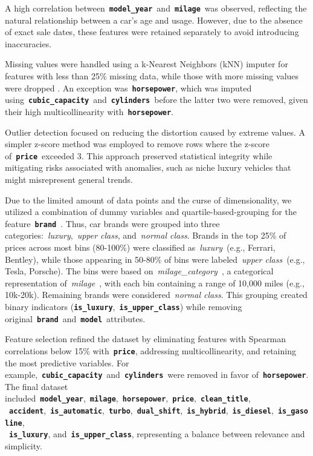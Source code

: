 \documentclass[a4paper,oneside,bibliography=totoc]{scrbook}
\begin{document}
A high correlation between~\textbf{\texttt{model\_year}}~and~\textbf{\texttt{milage}}~was observed, reflecting the natural relationship between a car's age and usage. However, due to the absence of exact sale dates, these features were retained separately to avoid introducing inaccuracies.

Missing values were handled using a k-Nearest Neighbors (kNN) imputer for features with less than 25\% missing data, while those with more missing values were dropped \cite{jadhav2019}. An exception was~\textbf{\texttt{horsepower}}, which was imputed using~\textbf{\texttt{cubic\_capacity}}~and~\textbf{\texttt{cylinders}}~before the latter two were removed, given their high multicollinearity with~\textbf{\texttt{horsepower}}.

Outlier detection focused on reducing the distortion caused by extreme values. A simpler z-score method was employed to remove rows where the z-score of~\textbf{\texttt{price}}~exceeded 3. This approach preserved statistical integrity while mitigating risks associated with anomalies, such as niche luxury vehicles that might misrepresent general trends.

Due to the limited amount of data points and the curse of dimensionality, we utilized a combination of dummy variables and quartile-based-grouping for the feature~\textbf{\texttt{brand}}~\cite{altman-2018, bellman-1961, ogundowole-2021}. Thus, car brands were grouped into three categories:~\emph{luxury},~\emph{upper class}, and~\emph{normal class}. Brands in the top 25\% of prices across most bins (80-100\%) were classified as~\emph{luxury}~(e.g., Ferrari, Bentley), while those appearing in 50-80\% of bins were labeled~\emph{upper class}~(e.g., Tesla, Porsche). The bins were based on~\emph{milage\_category}~, a categorical representation of~\emph{milage}~, with each bin containing a range of 10,000 miles (e.g., 10k-20k). Remaining brands were considered~\emph{normal class}. This grouping created binary indicators (\textbf{\texttt{is\_luxury}},~\textbf{\texttt{is\_upper\_class}}) while removing original~\textbf{\texttt{brand}}~and~\textbf{\texttt{model}}~attributes.

Feature selection refined the dataset by eliminating features with Spearman correlations below 15\% with~\textbf{\texttt{price}}, addressing multicollinearity, and retaining the most predictive variables. For example,~\textbf{\texttt{cubic\_capacity}}~and~\textbf{\texttt{cylinders}}~were removed in favor of~\textbf{\texttt{horsepower}}. The final dataset included~\textbf{\texttt{model\_year}},~\textbf{\texttt{milage}},~\textbf{\texttt{horsepower}},~\textbf{\texttt{price}},~\textbf{\texttt{clean\_title}},\\~\textbf{\texttt{accident}},~\textbf{\texttt{is\_automatic}},~\textbf{\texttt{turbo}},~\textbf{\texttt{dual\_shift}},~\textbf{\texttt{is\_hybrid}},~\textbf{\texttt{is\_diesel}},~\textbf{\texttt{is\_gasoline}},\\~\textbf{\texttt{is\_luxury}}, and~\textbf{\texttt{is\_upper\_class}}, representing a balance between relevance and simplicity.
\end{document}
